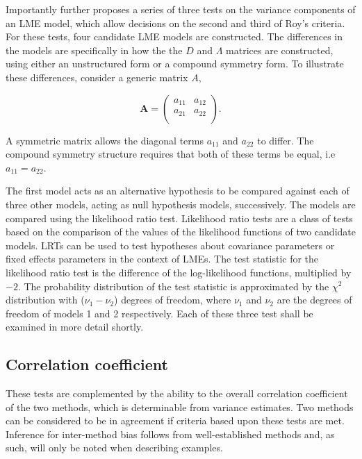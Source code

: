 \documentclass[12pt, a4paper]{report}
\theoremstyle{plain}
\theoremstyle{definition}
\theoremstyle{remark}
\begin{document}
Importantly \citet{roy} further proposes a series of three tests on the variance components of an LME model, which allow decisions on the second and third of Roy's criteria. For these tests, four candidate LME models are constructed. The differences in the models are specifically in how the the $D$ and $\Lambda$ matrices are constructed, using either an unstructured form or a compound symmetry form. To illustrate these differences, consider a generic matrix $A$,

\[
\boldsymbol{A} = \left( \begin{array}{cc}
a_{11} & a_{12}  \\
a_{21} & a_{22}  \\
\end{array}\right).
\]

A symmetric matrix allows the diagonal terms $a_{11}$ and $a_{22}$ to differ. The compound symmetry structure requires that both of these terms be equal, i.e $a_{11} = a_{22}$.

The first model acts as an alternative hypothesis to be compared against each of three other models, acting as null hypothesis models, successively. The models are compared using the likelihood ratio test. Likelihood ratio tests are a class of tests based on the comparison of the values of the likelihood functions of two candidate models. LRTs can be used to test hypotheses about covariance parameters or fixed effects parameters in the context of LMEs. The test statistic for the likelihood ratio test is the difference of the log-likelihood functions, multiplied by $-2$.
The probability distribution of the test statistic is approximated by the $\chi^2$ distribution with ($\nu_{1} - \nu_{2}$) degrees of freedom, where $\nu_{1}$ and $\nu_{2}$ are the degrees of freedom of models 1 and 2 respectively. Each of these three test shall be examined in more detail shortly.

\subsection{Correlation coefficient}

These tests are complemented by the ability to the overall correlation coefficient of the two methods, which is determinable from variance estimates. Two methods can be considered to be in agreement if criteria based upon these tests are met. Inference for inter-method bias follows from well-established methods and, as such, will only be noted when describing examples.
\end{document}
